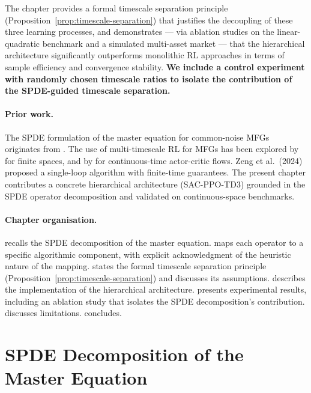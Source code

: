 The chapter provides a formal timescale separation principle
(Proposition~\ref{prop:timescale-separation}) that justifies the decoupling of these
three learning processes, and demonstrates --- via ablation studies on the
linear-quadratic benchmark and a simulated multi-asset market --- that the
hierarchical architecture significantly outperforms monolithic RL approaches in terms
of sample efficiency and convergence stability. \textbf{We include a control
experiment with randomly chosen timescale ratios to isolate the contribution of the
SPDE-guided timescale separation.}

\paragraph{Prior work.} The SPDE formulation of the master equation for common-noise
MFGs originates from \citep{carmonadelaruelachapelle2014}. The use of
multi-timescale RL for MFGs has been explored by \citep{angiulietal2024} for finite spaces, and by \citep{zhouzhouhu2025} for continuous-time
actor-critic flows. Zeng et al.\ (2024) proposed a single-loop algorithm with
finite-time guarantees. The present chapter contributes a concrete hierarchical
architecture (SAC-PPO-TD3) grounded in the SPDE operator decomposition and validated
on continuous-space benchmarks.

\paragraph{Chapter organisation.}  recalls the SPDE
decomposition of the master equation.  maps each operator to a
specific algorithmic component, with explicit acknowledgment of the heuristic nature
of the mapping.  states the formal timescale separation
principle (Proposition~\ref{prop:timescale-separation}) and discusses its
assumptions.  describes the implementation of the
hierarchical architecture.  presents experimental results,
including an ablation study that isolates the SPDE decomposition's contribution.
 discusses limitations. 
concludes.


\section{SPDE Decomposition of the Master Equation}
\label{sec:hrl-decomposition}

